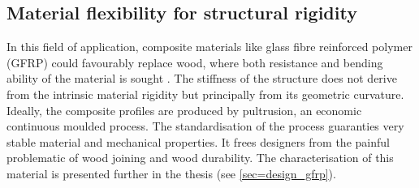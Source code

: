 
\pagebreak
\addtomargin[l]{6cm}
\afterpage{\restoremargin}

\subsection{Material flexibility for structural rigidity}\label{sec=def_flexibility}
In this field of application, composite materials like glass fibre reinforced polymer (GFRP) could favourably replace wood, where both resistance and bending ability of the material is sought \cite{Douthe2010a}. The stiffness of the structure does not derive from the intrinsic material rigidity but principally from its geometric curvature. Ideally, the composite profiles are produced by pultrusion, an economic continuous moulded process. The standardisation of the process guaranties very stable material and mechanical properties. It frees designers from the painful problematic of wood joining and wood durability. The characterisation of this material is presented further in the thesis (see \cref{sec=design_gfrp}).

